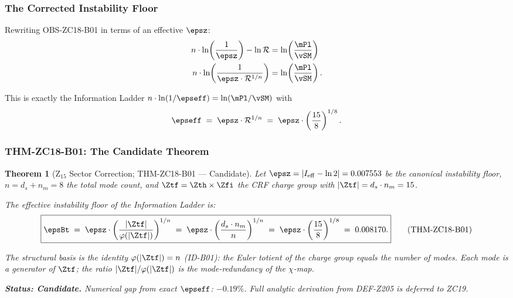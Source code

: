 \documentclass[12pt, a4paper]{article}
\newtheorem{theorem}{Theorem}[section]
\begin{document}
\subsubsection{The Corrected Instability Floor}

Rewriting OBS-ZC18-B01 in terms of an effective $\epsz$:
\begin{align}
  n\cdot\ln\!\left(\frac{1}{\epsz}\right) - \ln\mathcal{R}
  &= \ln\!\left(\frac{\mPl}{\vSM}\right)
  \notag\\
  n\cdot\ln\!\left(\frac{1}{\epsz\cdot\mathcal{R}^{1/n}}\right)
  &= \ln\!\left(\frac{\mPl}{\vSM}\right).
  \label{zc18b:eq:rearrange}
\end{align}

This is exactly the Information Ladder $n\cdot\ln(1/\epseff)=\ln(\mPl/\vSM)$
with
\begin{equation}
  \epseff \;=\; \epsz \cdot \mathcal{R}^{1/n}
  \;=\; \epsz\cdot\left(\frac{15}{8}\right)^{1/8}.
  \label{zc18b:eq:eps-corr}
\end{equation}

\subsubsection{THM-ZC18-B01: The Candidate Theorem}

\begin{theorem}[Z$_{15}$ Sector Correction; THM-ZC18-B01 --- Candidate]
\label{zc18b:thm:z15}
Let $\epsz = |I_{\rm eff} - \ln 2| = 0.007553$ be the canonical
instability floor, $n = d_s + n_m = 8$ the total mode count,
and $\Ztf = \Zth\times\Zfi$ the CRF charge group with
$|\Ztf| = d_s\cdot n_m = 15$.

The effective instability floor of the Information Ladder is:
\begin{equation}
  \boxed{%
    \epsBt \;=\; \epsz\cdot\left(\frac{|\Ztf|}{\varphi(|\Ztf|)}\right)^{1/n}
    \;=\; \epsz\cdot\left(\frac{d_s\cdot n_m}{n}\right)^{1/n}
    \;=\; \epsz\cdot\left(\frac{15}{8}\right)^{1/8}
    \;=\; 0.008170.
  }
  \tag{THM-ZC18-B01}\label{zc18b:eq:thm-b01}
\end{equation}

The structural basis is the identity $\varphi(|\Ztf|) = n$ (ID-B01):
the Euler totient of the charge group equals the number of modes.
Each mode is a generator of $\Ztf$; the ratio $|\Ztf|/\varphi(|\Ztf|)$
is the mode-redundancy of the $\chi$-map.

\textbf{Status: Candidate.} Numerical gap from exact $\epseff$: $-0.19\%$.
Full analytic derivation from DEF-Z205 is deferred to ZC19.
\end{theorem}
\end{document}
